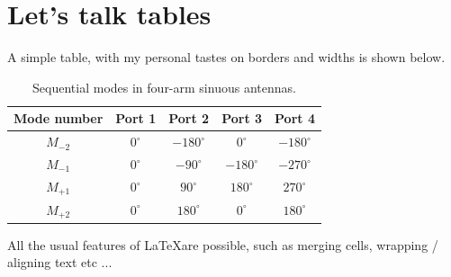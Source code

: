 \documentclass[openright=true,
title={This is my title}%
]{nus-thesis}
\begin{document}
\ResetFloatsInChapter{}
\chapter{Let's talk tables}
\label{chap:tables}

A simple table, with my personal tastes on borders and widths is shown below. 
\begin{table}[!htbp]
\begin{center}
\caption{Sequential modes in four-arm sinuous antennas.} 
\label{table:4sinuous_modes}
\def\arraystretch{1.5}
\begin{tabular}{|c | c | c | c | c |}
 \hline
Mode number & Port 1 & Port 2 & Port 3 & Port 4 \\
\hline
$M_{-2}$ & $0^\circ$ & $-180^\circ$ & $0^\circ$ & $-180^\circ$ \\ \hline
$M_{-1}$ & $0^\circ$ & $-90^\circ$ & $-180^\circ$ & $-270^\circ$ \\ \hline
$M_{+1}$ & $0^\circ$ & $90^\circ$ & $180^\circ$ & $270^\circ$ \\ \hline
$M_{+2}$ & $0^\circ$ & $180^\circ$ & $0^\circ$ & $180^\circ$ \\  \hline
\end{tabular}
\end{center}
\end{table}

\newpage

All the usual features of \LaTeX are possible, such as merging cells, wrapping / aligning text etc ...
\end{document}
